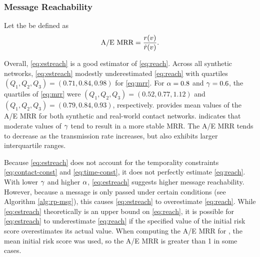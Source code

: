 \subsubsection{Message Reachability}

Let the  be defined as
\begin{equation*}
  \text{A/E MRR} = \frac{r(v)}{\hat{r}(v)}.
\end{equation*}

Overall, \cref{eq:estreach} is a good estimator of \cref{eq:reach}. Across all synthetic networks, \cref{eq:estreach} modestly underestimated \cref{eq:reach} with quartiles $(Q_1, Q_2, Q_3) = (0.71, 0.84, 0.98)$ for \cref{eq:mrr}. For $\alpha = 0.8$ and $\gamma = 0.6$, the quartiles of \cref{eq:mrr} were $(Q_1, Q_2, Q_3) = (0.52, 0.77, 1.12)$ and $(Q_1, Q_2, Q_3) = (0.79, 0.84, 0.93)$, respectively.  provides mean values of the A/E MRR for both synthetic and real-world contact networks.  indicates that moderate values of $\gamma$ tend to result in a more stable MRR. The A/E MRR tends to decrease as the transmission rate increases, but also exhibits larger interquartile ranges.

Because \cref{eq:estreach} does not account for the temporality constraints \cref{eq:contact-const} and \cref{eq:time-const}, it does not perfectly estimate \cref{eq:reach}. With lower $\gamma$ and higher $\alpha$, \cref{eq:estreach} suggests higher message reachability. However, because a message is only passed under certain conditions (see Algorithm \ref{alg:rp-msg}), this causes \cref{eq:estreach} to overestimate \cref{eq:reach}. While \cref{eq:estreach} theoretically is an upper bound on \cref{eq:reach}, it is possible for \cref{eq:estreach} to underestimate \cref{eq:reach} if the specified value of the initial risk score overestimates its actual value. When computing the A/E MRR for , the mean initial risk score was used, so the A/E MRR is greater than 1 in some cases.

